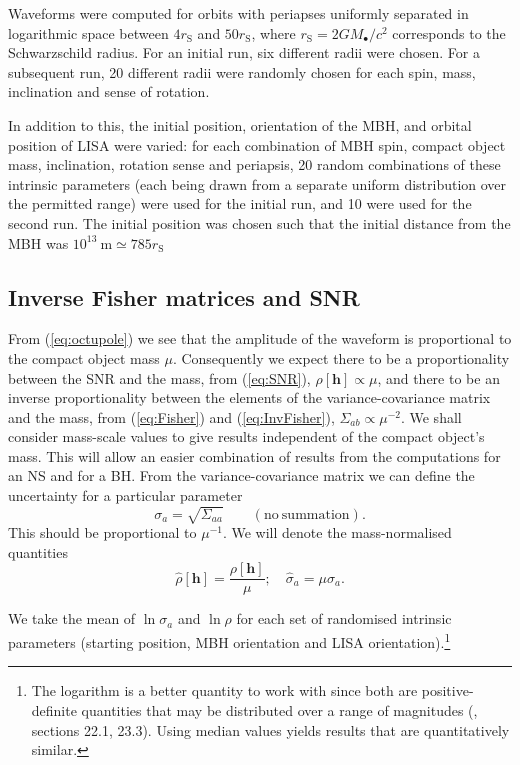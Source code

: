\documentclass[useAMS,usedcolumn,usegraphicx,usenatbib]{mn2e}
\newcommand{\eqnref}[1]{(\ref{eq:#1})}
\newcommand{\sub}[1]{\ensuremath{_\mathrm{#1}}}
\begin{document}
Waveforms were computed for orbits with periapses uniformly separated in logarithmic space between $4 r\sub{S}$ and $50 r\sub{S}$, where $r\sub{S} = 2 GM_\bullet / c^2$ corresponds to the Schwarzschild radius. For an initial run, six different radii were chosen. For a subsequent run, 20 different radii were randomly chosen for each spin, mass, inclination and sense of rotation.

In addition to this, the initial position, orientation of the MBH, and orbital position of LISA were varied: for each combination of MBH spin, compact object mass, inclination, rotation sense and periapsis, 20 random combinations of these intrinsic parameters (each being drawn from a separate uniform distribution over the permitted range) were used for the initial run, and 10 were used for the second run. The initial position was chosen such that the initial distance from the MBH was $10^{13}~\mathrm{m} \simeq 785 r\sub{S}$

\subsection{Inverse Fisher matrices and SNR}

From \eqnref{octupole} we see that the amplitude of the waveform is proportional to the compact object mass $\mu$. Consequently we expect there to be a proportionality between the SNR and the mass, from \eqnref{SNR}, $\rho[\boldsymbol{h}] \propto \mu$, and there to be an inverse proportionality between the elements of the variance-covariance matrix and the mass, from \eqnref{Fisher} and \eqnref{InvFisher}, $\Sigma_{ab} \propto \mu^{-2}$. We shall consider mass-scale values to give results independent of the compact object's mass. This will allow an easier combination of results from the computations for an NS and for a BH. From the variance-covariance matrix we can define the uncertainty for a particular parameter
\begin{equation}
\sigma_a = \sqrt{\Sigma_{aa}} \qquad \mathrm{(no\ summation)}.
\end{equation}
This should be proportional to $\mu^{-1}$. We will denote the mass-normalised quantities
\begin{equation}
\hat{\rho}[\boldsymbol{h}] = \frac{\rho[\boldsymbol{h}]}{\mu}; \quad \hat{\sigma}_a = \mu\sigma_a.
\end{equation}

We take the mean of $\ln \sigma_a$ and $\ln \rho$ for each set of randomised intrinsic parameters (starting position, MBH orientation and LISA orientation).\footnote{The logarithm is a better quantity to work with since both are positive-definite quantities that may be distributed over a range of magnitudes (\citealt{Mackay2003}, sections 22.1, 23.3). Using median values yields results that are quantitatively similar.}
\end{document}
